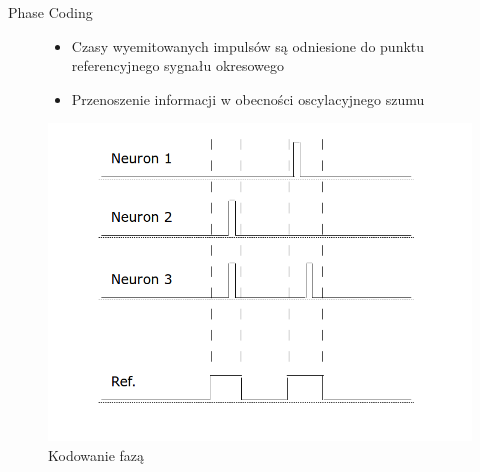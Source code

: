\documentclass{beamer}
\begin{document}
\begin{frame}{Phase Coding}
	\begin{figure}[ht]
		\begin{minipage}{0.48\linewidth}
			\begin{itemize}
				\item Czasy wyemitowanych impulsów są odniesione do punktu referencyjnego sygnału okresowego
				\item Przenoszenie informacji w obecności oscylacyjnego szumu
			\end{itemize}
		\end{minipage}
		\hfill
		\begin{minipage}{0.48\linewidth}
		\centering
		\includegraphics[width=\textwidth]{Phase.png}
		\caption{Kodowanie fazą}
		\end{minipage}
	\end{figure}
\end{frame}
\end{document}
